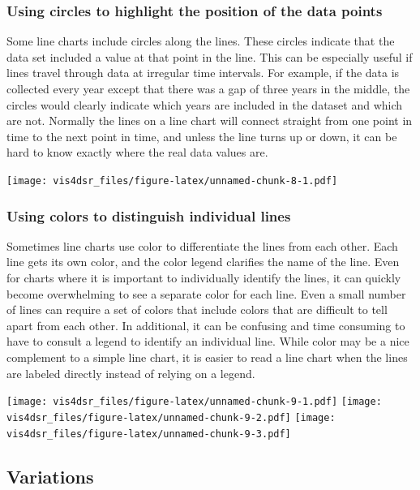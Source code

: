 \documentclass[
]{krantz}
\begin{document}
\hypertarget{using-circles-to-highlight-the-position-of-the-data-points}{%
\subsubsection{Using circles to highlight the position of the data points}\label{using-circles-to-highlight-the-position-of-the-data-points}}

Some line charts include circles along the lines. These circles indicate that the
data set included a value at that point in the line. This can be especially useful
if lines travel through data at irregular time intervals. For example, if the data
is collected every year except that there was a gap of three years in the middle,
the circles would clearly indicate which years are included in the dataset and which
are not. Normally the lines on a line chart will connect straight from one point in
time to the next point in time, and unless the line turns up or down, it can be
hard to know exactly where the real data values are.

\texttt{[image: vis4dsr\_files/figure-latex/unnamed-chunk-8-1.pdf]}

\hypertarget{using-colors-to-distinguish-individual-lines}{%
\subsubsection{Using colors to distinguish individual lines}\label{using-colors-to-distinguish-individual-lines}}

Sometimes line charts use color to differentiate the lines from each other. Each line
gets its own color, and the color legend clarifies the name of the line. Even for
charts where it is important to individually identify the lines, it can quickly
become overwhelming to see a separate color for each line. Even a small number of
lines can require a set of colors that include colors that are difficult to tell
apart from each other. In additional, it can be confusing and time consuming to have
to consult a legend to identify an individual line. While color may be a nice
complement to a simple line chart, it is easier to read a line chart when the lines
are labeled directly instead of relying on a legend.

\texttt{[image: vis4dsr\_files/figure-latex/unnamed-chunk-9-1.pdf]} \texttt{[image: vis4dsr\_files/figure-latex/unnamed-chunk-9-2.pdf]} \texttt{[image: vis4dsr\_files/figure-latex/unnamed-chunk-9-3.pdf]}

\hypertarget{variations-2}{%
\subsection{Variations}\label{variations-2}}
\end{document}
